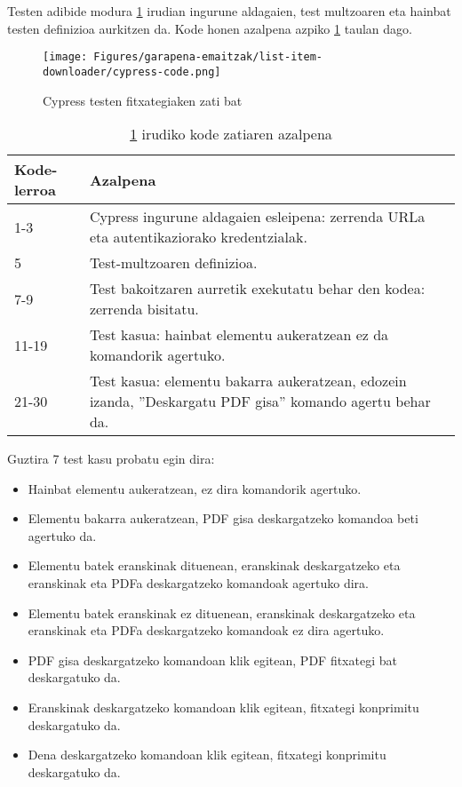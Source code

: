 Testen adibide modura \ref{cypress-code} irudian ingurune aldagaien, test multzoaren eta hainbat testen definizioa aurkitzen da. Kode honen azalpena azpiko \ref{cypress-code-explain} taulan dago.

\begin{figure}[H]
\centering
\texttt{[image: Figures/garapena-emaitzak/list-item-downloader/cypress-code.png]}
\caption{Cypress testen fitxategiaken zati bat}
\label{cypress-code}
\end{figure}

\begin{table}[H]
\centering
{}
\def\arraystretch{1.5}%
\begin{tabular}{ p{2.5cm} p{11.5cm} }
\hline
\textbf{Kode-lerroa} & \textbf{Azalpena}\\
\hline
1-3  & Cypress ingurune aldagaien esleipena: zerrenda URLa eta autentikaziorako kredentzialak. \\
5  & Test-multzoaren definizioa. \\
7-9  & Test bakoitzaren aurretik exekutatu behar den kodea: zerrenda bisitatu.\\
11-19  & Test kasua: hainbat elementu aukeratzean ez da komandorik agertuko. \\
21-30  & Test kasua: elementu bakarra aukeratzean, edozein izanda, ''Deskargatu PDF gisa'' komando agertu behar da.\\
\hline
\end{tabular}
\caption{\ref{cypress-code} irudiko kode zatiaren azalpena}
\label{cypress-code-explain}
\end{table}

Guztira 7 test kasu probatu egin dira:
\begin{itemize}
    \item Hainbat elementu aukeratzean, ez dira komandorik agertuko.
    \item Elementu bakarra aukeratzean, PDF gisa deskargatzeko komandoa beti agertuko da.
    \item Elementu batek eranskinak dituenean, eranskinak deskargatzeko eta eranskinak eta PDFa deskargatzeko komandoak agertuko dira.
    \item Elementu batek eranskinak ez dituenean, eranskinak deskargatzeko eta eranskinak eta PDFa deskargatzeko komandoak ez dira agertuko.
    \item PDF gisa deskargatzeko komandoan klik egitean, PDF fitxategi bat deskargatuko da.
    \item Eranskinak deskargatzeko komandoan klik egitean, fitxategi konprimitu deskargatuko da.
    \item Dena deskargatzeko komandoan klik egitean, fitxategi konprimitu deskargatuko da.
\end{itemize}

